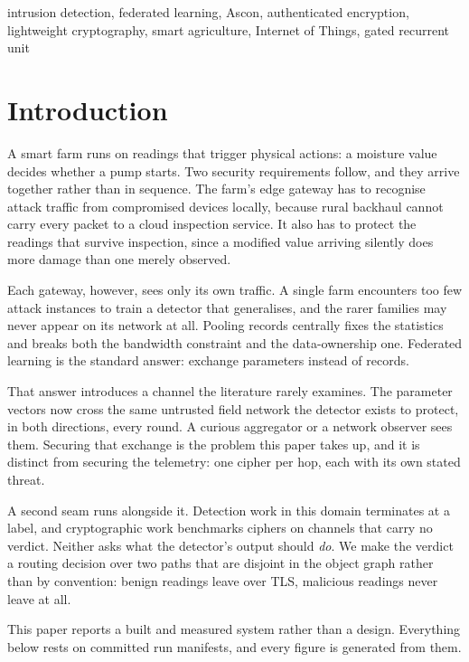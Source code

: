 \documentclass[conference]{IEEEtran}
\begin{document}
\begin{IEEEkeywords}
intrusion detection, federated learning, Ascon, authenticated encryption, lightweight
cryptography, smart agriculture, Internet of Things, gated recurrent unit
\end{IEEEkeywords}

\section{Introduction}
A smart farm runs on readings that trigger physical actions: a moisture value decides
whether a pump starts. Two security requirements follow, and they arrive together rather than in
sequence. The farm's edge gateway has to recognise attack traffic from compromised devices
locally, because rural backhaul cannot carry every packet to a cloud inspection service. It also
has to protect the readings that survive inspection, since a modified value arriving silently does
more damage than one merely observed.

Each gateway, however, sees only its own traffic. A single farm encounters too few attack
instances to train a detector that generalises, and the rarer families may never appear on its
network at all. Pooling records centrally fixes the statistics and breaks both the bandwidth
constraint and the data-ownership one. Federated learning is the standard answer: exchange
parameters instead of records.

That answer introduces a channel the literature rarely examines. The parameter vectors now cross
the same untrusted field network the detector exists to protect, in both directions, every round.
A curious aggregator or a network observer sees them. Securing that exchange is the problem this
paper takes up, and it is distinct from securing the telemetry: one cipher per hop, each with its
own stated threat.

A second seam runs alongside it. Detection work in this domain terminates at a label, and
cryptographic work benchmarks ciphers on channels that carry no verdict. Neither asks what the
detector's output should \emph{do}. We make the verdict a routing decision over two paths that are
disjoint in the object graph rather than by convention: benign readings leave over TLS, malicious
readings never leave at all.

This paper reports a built and measured system rather than a design. Everything below rests on
committed run manifests, and every figure is generated from them.
\end{document}
